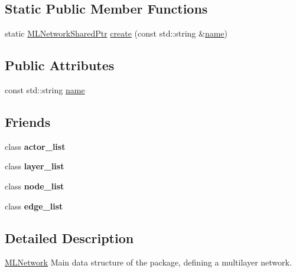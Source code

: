 \subsection*{Static Public Member Functions}
\begin{DoxyCompactItemize}
\item 
static \hyperlink{namespacemlnet_aa6d3fa87865bcde4d1283abb1942cbbb}{M\+L\+Network\+Shared\+Ptr} \hyperlink{classmlnet_1_1_m_l_network_af4f8d98426a76652f1a4503c202e3c98}{create} (const std\+::string \&\hyperlink{classmlnet_1_1_m_l_network_aa2e1496321423e15a8e97e0daed30ca7}{name})
\end{DoxyCompactItemize}
\subsection*{Public Attributes}
\begin{DoxyCompactItemize}
\item 
const std\+::string \hyperlink{classmlnet_1_1_m_l_network_aa2e1496321423e15a8e97e0daed30ca7}{name}
\end{DoxyCompactItemize}
\subsection*{Friends}
\begin{DoxyCompactItemize}
\item 
\hypertarget{classmlnet_1_1_m_l_network_adf12125ac9f1f53844917c917c80873e}{class {\bfseries actor\+\_\+list}}\label{classmlnet_1_1_m_l_network_adf12125ac9f1f53844917c917c80873e}

\item 
\hypertarget{classmlnet_1_1_m_l_network_a0b92bd721386a2a578989d4a0876767f}{class {\bfseries layer\+\_\+list}}\label{classmlnet_1_1_m_l_network_a0b92bd721386a2a578989d4a0876767f}

\item 
\hypertarget{classmlnet_1_1_m_l_network_a1b7f8553ab7e425c0d59e59e4399f475}{class {\bfseries node\+\_\+list}}\label{classmlnet_1_1_m_l_network_a1b7f8553ab7e425c0d59e59e4399f475}

\item 
\hypertarget{classmlnet_1_1_m_l_network_ad40e7612c45d00b231b57e69f1b1ff4f}{class {\bfseries edge\+\_\+list}}\label{classmlnet_1_1_m_l_network_ad40e7612c45d00b231b57e69f1b1ff4f}

\end{DoxyCompactItemize}


\subsection{Detailed Description}
\hyperlink{classmlnet_1_1_m_l_network}{M\+L\+Network} Main data structure of the package, defining a multilayer network. 

